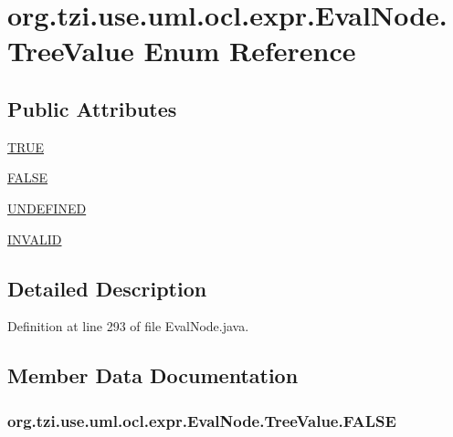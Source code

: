 \hypertarget{enumorg_1_1tzi_1_1use_1_1uml_1_1ocl_1_1expr_1_1_eval_node_1_1_tree_value}{\section{org.\-tzi.\-use.\-uml.\-ocl.\-expr.\-Eval\-Node.\-Tree\-Value Enum Reference}
\label{enumorg_1_1tzi_1_1use_1_1uml_1_1ocl_1_1expr_1_1_eval_node_1_1_tree_value}
}
\subsection*{Public Attributes}
\begin{DoxyCompactItemize}
\item 
\hyperlink{enumorg_1_1tzi_1_1use_1_1uml_1_1ocl_1_1expr_1_1_eval_node_1_1_tree_value_a8b45f4b8903b91d12b65bb850c33dbc2}{T\-R\-U\-E}
\item 
\hyperlink{enumorg_1_1tzi_1_1use_1_1uml_1_1ocl_1_1expr_1_1_eval_node_1_1_tree_value_af74bd5e758f10ab8ea13e6e914d34a84}{F\-A\-L\-S\-E}
\item 
\hyperlink{enumorg_1_1tzi_1_1use_1_1uml_1_1ocl_1_1expr_1_1_eval_node_1_1_tree_value_a523dd8a6eaaad40da942f6deb29ec4e7}{U\-N\-D\-E\-F\-I\-N\-E\-D}
\item 
\hyperlink{enumorg_1_1tzi_1_1use_1_1uml_1_1ocl_1_1expr_1_1_eval_node_1_1_tree_value_aff902f08a7612c2960a895d0a7551178}{I\-N\-V\-A\-L\-I\-D}
\end{DoxyCompactItemize}


\subsection{Detailed Description}


Definition at line 293 of file Eval\-Node.\-java.



\subsection{Member Data Documentation}
\hypertarget{enumorg_1_1tzi_1_1use_1_1uml_1_1ocl_1_1expr_1_1_eval_node_1_1_tree_value_af74bd5e758f10ab8ea13e6e914d34a84}{
\subsubsection[{F\-A\-L\-S\-E}]{\setlength{\rightskip}{0pt plus 5cm}org.\-tzi.\-use.\-uml.\-ocl.\-expr.\-Eval\-Node.\-Tree\-Value.\-F\-A\-L\-S\-E}}\label{enumorg_1_1tzi_1_1use_1_1uml_1_1ocl_1_1expr_1_1_eval_node_1_1_tree_value_af74bd5e758f10ab8ea13e6e914d34a84}


